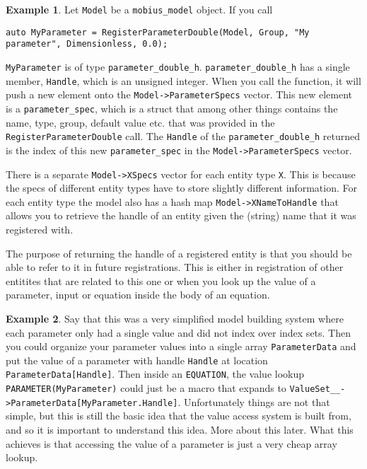 \documentclass[11pt]{article}
\theoremstyle{definition}
\newtheorem{myexample}{Example}
\newenvironment{example}%
  {\begin{lrbox}{\examplebox}%
   \begin{minipage}{\dimexpr\linewidth-2\fboxsep}
   \begin{myexample}}%
  {\end{myexample}%
   \end{minipage}%
   \end{lrbox}%
   \begin{trivlist}
     \item[]\colorbox{silver}{\usebox\examplebox}
   \end{trivlist}}
\begin{document}
\begin{example}
Let {\tt Model} be a {\tt mobius\_model} object. If you call
\begin{lstlisting}[style=mycpp]
auto MyParameter = RegisterParameterDouble(Model, Group, "My parameter", Dimensionless, 0.0);
\end{lstlisting}
{\tt MyParameter} is of type {\tt parameter\_double\_h}. {\tt parameter\_double\_h} has a single member, {\tt Handle}, which is an unsigned integer. When you call the function, it will push a new element onto the {\tt Model->ParameterSpecs} vector. This new element is a {\tt parameter\_spec}, which is a struct that among other things contains the name, type, group, default value etc. that was provided in the {\tt RegisterParameterDouble} call. The {\tt Handle} of the {\tt parameter\_double\_h} returned is the index of this new {\tt parameter\_spec} in the {\tt Model->ParameterSpecs} vector.
\end{example}

There is a separate {\tt Model->XSpecs} vector for each entity type {\tt X}. This is because the specs of different entity types have to store slightly different information. For each entity type the model also has a hash map {\tt Model->XNameToHandle} that allows you to retrieve the handle of an entity given the (string) name that it was registered with.

The purpose of returning the handle of a registered entity is that you should be able to refer to it in future registrations. This is either in registration of other entitites that are related to this one or when you look up the value of a parameter, input or equation inside the body of an equation.

\begin{example}
Say that this was a very simplified model building system where each parameter only had a single value and did not index over index sets. Then you could organize your parameter values into a single array {\tt ParameterData} and put the value of a parameter with handle {\tt Handle} at location {\tt ParameterData[Handle]}. Then inside an {\tt EQUATION}, the value lookup {\tt PARAMETER(MyParameter)} could just be a macro that expands to {\tt ValueSet\_\_->ParameterData[MyParameter.Handle]}. Unfortunately things are not that simple, but this is still the basic idea that the value access system is built from, and so it is important to understand this idea. More about this later. What this achieves is that accessing the value of a parameter is just a very cheap array lookup.
\end{example}
\end{document}
